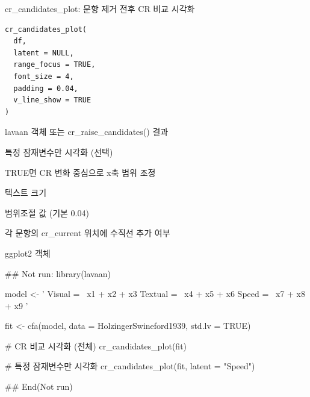 \documentclass[a4paper]{book}
\begin{document}
%
\begin{Description}
cr\_candidates\_plot: 문항 제거 전후 CR 비교 시각화
\end{Description}
%
\begin{Usage}
\begin{verbatim}
cr_candidates_plot(
  df,
  latent = NULL,
  range_focus = TRUE,
  font_size = 4,
  padding = 0.04,
  v_line_show = TRUE
)
\end{verbatim}
\end{Usage}
%
\begin{Arguments}
\begin{ldescription}
\item[\code{df}] lavaan 객체 또는 cr\_raise\_candidates() 결과

\item[\code{latent}] 특정 잠재변수만 시각화 (선택)

\item[\code{range\_focus}] TRUE면 CR 변화 중심으로 x축 범위 조정

\item[\code{font\_size}] 텍스트 크기

\item[\code{padding}] 범위조절 값 (기본 0.04)

\item[\code{v\_line\_show}] 각 문항의 cr\_current 위치에 수직선 추가 여부
\end{ldescription}
\end{Arguments}
%
\begin{Value}
ggplot2 객체
\end{Value}
%
\begin{Examples}
\begin{ExampleCode}
\#\# Not run: 
library(lavaan)

model <- '
  Visual  =~ x1 + x2 + x3
  Textual =~ x4 + x5 + x6
  Speed   =~ x7 + x8 + x9
'

fit <- cfa(model, data = HolzingerSwineford1939, std.lv = TRUE)

# CR 비교 시각화 (전체)
cr_candidates_plot(fit)

# 특정 잠재변수만 시각화
cr_candidates_plot(fit, latent = "Speed")

## End(Not run)
\end{ExampleCode}
\end{Examples}
\end{document}
